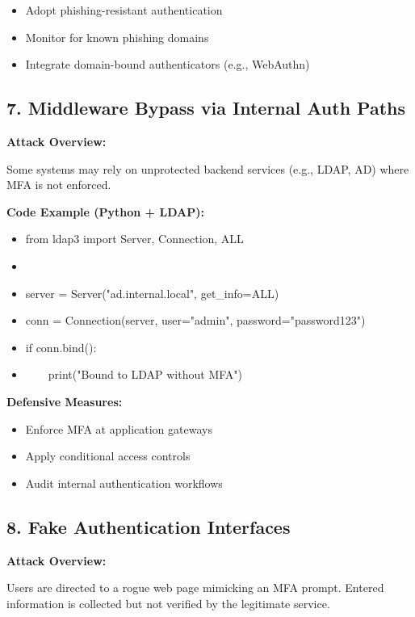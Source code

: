 \begin{itemize}
    \item Adopt phishing-resistant authentication
    \item Monitor for known phishing domains
    \item Integrate domain-bound authenticators (e.g., WebAuthn)

\end{itemize}

\subsection{\textbf{7. Middleware Bypass via Internal Auth Paths}}

\textbf{Attack Overview:}

 Some systems may rely on unprotected backend services (e.g., LDAP, AD) where MFA is not enforced.

\textbf{Code Example (Python + LDAP):}

\begin{itemize}
    \item from ldap3 import Server, Connection, ALL
    \item 

    \item server = Server("ad.internal.local", get\_info=ALL)
    \item conn = Connection(server, user="admin", password="password123")
    \item if conn.bind():
    \item     print("Bound to LDAP without MFA")
\end{itemize}

\textbf{Defensive Measures:}

\begin{itemize}
    \item Enforce MFA at application gateways
    \item Apply conditional access controls
    \item Audit internal authentication workflows

\end{itemize}

\subsection{\textbf{8. Fake Authentication Interfaces}}

\textbf{Attack Overview:}

Users are directed to a rogue web page mimicking an MFA prompt. Entered information is collected but not verified by the legitimate service.

